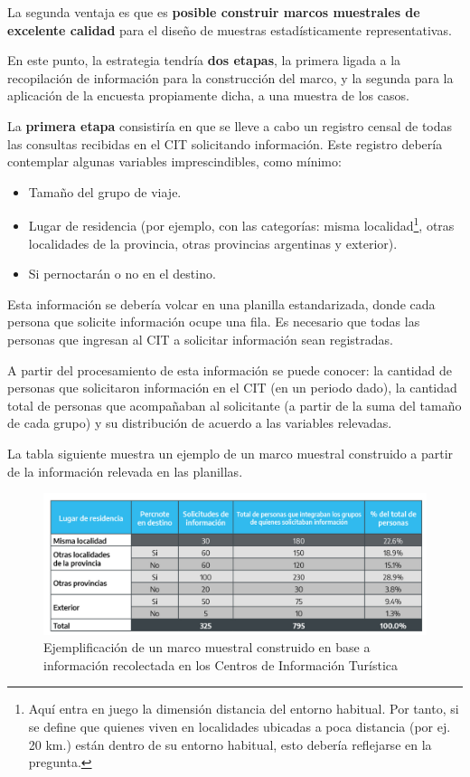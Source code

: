 \documentclass[
]{book}
\begin{document}
La segunda ventaja es que es \textbf{posible construir marcos muestrales de excelente calidad} para el diseño de muestras estadísticamente representativas.

En este punto, la estrategia tendría \textbf{dos etapas}, la primera ligada a la recopilación de información para la construcción del marco, y la segunda para la aplicación de la encuesta propiamente dicha, a una muestra de los casos.

La \textbf{primera etapa} consistiría en que se lleve a cabo un registro censal de todas las consultas recibidas en el CIT solicitando información. Este registro debería contemplar algunas variables imprescindibles, como mínimo:

\begin{itemize}
\item
  Tamaño del grupo de viaje.
\item
  Lugar de residencia (por ejemplo, con las categorías: misma localidad\footnote{Aquí entra en juego la dimensión distancia del entorno habitual. Por tanto, si se define que quienes viven en localidades ubicadas a poca distancia (por ej. 20 km.) están dentro de su entorno habitual, esto debería reflejarse en la pregunta.}, otras localidades de la provincia, otras provincias argentinas y exterior).
\item
  Si pernoctarán o no en el destino.\\
\end{itemize}

Esta información se debería volcar en una planilla estandarizada, donde cada persona que solicite información ocupe una fila. Es necesario que todas las personas que ingresan al CIT a solicitar información sean registradas.

A partir del procesamiento de esta información se puede conocer: la cantidad de personas que solicitaron información en el CIT (en un periodo dado), la cantidad total de personas que acompañaban al solicitante (a partir de la suma del tamaño de cada grupo) y su distribución de acuerdo a las variables relevadas.

\hfill\break
La tabla siguiente muestra un ejemplo de un marco muestral construido a partir de la información relevada en las planillas.

\begin{figure}

{\centering \includegraphics[width=1\linewidth]{imagenes/figura_2} 

}

\caption{Ejemplificación de un marco muestral construido en base a información recolectada en los Centros de Información Turística}\label{fig:Lugarderesidencia}
\end{figure}
\end{document}
